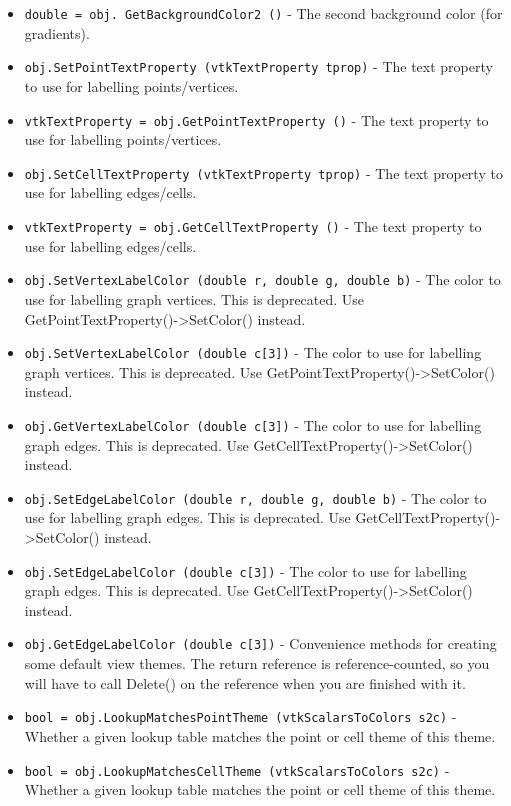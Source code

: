 \begin{itemize}
\item  \verb|double = obj. GetBackgroundColor2 ()| -  The second background color (for gradients).

\item  \verb|obj.SetPointTextProperty (vtkTextProperty tprop)| -  The text property to use for labelling points/vertices.

\item  \verb|vtkTextProperty = obj.GetPointTextProperty ()| -  The text property to use for labelling points/vertices.

\item  \verb|obj.SetCellTextProperty (vtkTextProperty tprop)| -  The text property to use for labelling edges/cells.

\item  \verb|vtkTextProperty = obj.GetCellTextProperty ()| -  The text property to use for labelling edges/cells.

\item  \verb|obj.SetVertexLabelColor (double r, double g, double b)| -  The color to use for labelling graph vertices.
 This is deprecated. Use GetPointTextProperty()->SetColor() instead.

\item  \verb|obj.SetVertexLabelColor (double c[3])| -  The color to use for labelling graph vertices.
 This is deprecated. Use GetPointTextProperty()->SetColor() instead.

\item  \verb|obj.GetVertexLabelColor (double c[3])| -  The color to use for labelling graph edges.
 This is deprecated. Use GetCellTextProperty()->SetColor() instead.

\item  \verb|obj.SetEdgeLabelColor (double r, double g, double b)| -  The color to use for labelling graph edges.
 This is deprecated. Use GetCellTextProperty()->SetColor() instead.

\item  \verb|obj.SetEdgeLabelColor (double c[3])| -  The color to use for labelling graph edges.
 This is deprecated. Use GetCellTextProperty()->SetColor() instead.

\item  \verb|obj.GetEdgeLabelColor (double c[3])| -  Convenience methods for creating some default view themes.
 The return reference is reference-counted, so you will have to call
 Delete() on the reference when you are finished with it.

\item  \verb|bool = obj.LookupMatchesPointTheme (vtkScalarsToColors s2c)| -  Whether a given lookup table matches the point or cell theme of this
 theme.

\item  \verb|bool = obj.LookupMatchesCellTheme (vtkScalarsToColors s2c)| -  Whether a given lookup table matches the point or cell theme of this
 theme.

\end{itemize}
